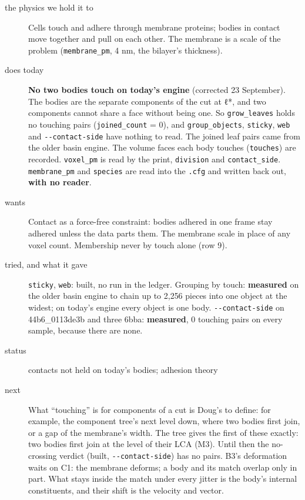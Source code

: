\begin{description}
\item[{the physics we hold it to}] Cells touch and adhere through membrane proteins; bodies in contact move together and pull on each other. The membrane is a scale of the problem (\texttt{membrane\_\allowbreak{}pm}, 4 nm, the bilayer's thickness).
\item[{does today}] \textbf{No two bodies touch on today's engine} (corrected 23 September). The bodies are the separate components of the cut at ℓ*, and two components cannot share a face without being one. So \texttt{grow\_\allowbreak{}leaves} holds no touching pairs (\texttt{joined\_\allowbreak{}count} = 0), and \texttt{group\_\allowbreak{}objects}, \texttt{sticky}, \texttt{web} and \texttt{-\allowbreak{}-\allowbreak{}contact-\allowbreak{}side} have nothing to read. The joined leaf pairs came from the older basin engine. The volume faces each body touches (\texttt{touches}) are recorded. \texttt{voxel\_\allowbreak{}pm} is read by the print, \texttt{division} and \texttt{contact\_\allowbreak{}side}. \texttt{membrane\_\allowbreak{}pm} and \texttt{species} are read into the \texttt{.\allowbreak{}cfg} and written back out, \textbf{with no reader}.
\item[{wants}] Contact as a force-free constraint: bodies adhered in one frame stay adhered unless the data parts them. The membrane scale in place of any voxel count. Membership never by touch alone (row 9).
\item[{tried, and what it gave}] \texttt{sticky}, \texttt{web}: built, no run in the ledger. Grouping by touch: \textbf{measured} on the older basin engine to chain up to 2,256 pieces into one object at the widest; on today's engine every object is one body. \texttt{-\allowbreak{}-\allowbreak{}contact-\allowbreak{}side} on 44b6\_\allowbreak{}0113de3b and three 6bba: \textbf{measured}, 0 touching pairs on every sample, because there are none.
\item[{status}] contacts not held on today's bodies; adhesion theory
\item[{next}] What “touching” is for components of a cut is Doug's to define: for example, the component tree's next level down, where two bodies first join, or a gap of the membrane's width. The tree gives the first of these exactly: two bodies first join at the level of their LCA (M3). Until then the no-crossing verdict (built, \texttt{-\allowbreak{}-\allowbreak{}contact-\allowbreak{}side}) has no pairs. B3's deformation waits on C1: the membrane deforms; a body and its match overlap only in part. What stays inside the match under every jitter is the body's internal constituents, and their shift is the velocity and vector.
\end{description}

